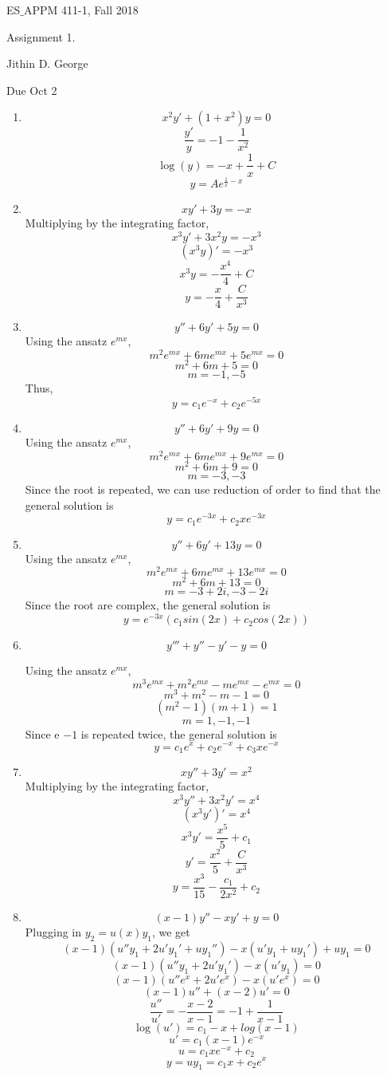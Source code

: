 \documentclass[letterpaper,12pt]{article}
\begin{document}




\noindent
{\scriptsize ES$\_$APPM 411-1, Fall 2018} \hfill

\begin{center}
\large
Assignment 1.
\normalsize

Jithin D. George
\end{center}

\noindent
Due Oct 2
\vspace{.3in}




\noindent


\begin{enumerate}
\item
\[x^2y' +(1+x^2)y =0\]
\[\frac{y'}{y} = -1- \frac{1}{x^2}\]
\[\log(y)= -x+\frac{1}{x}+C\]
\[y = Ae^{\frac{1}{x}-x}\]
\item
\[xy' + 3y=-x\]
Multiplying by the integrating factor,
\[x^3y' + 3x^2y=-x^3\]
\[(x^3y)'=-x^3\]
\[x^3y=-\frac{x^4}{4}+C\]
\[y=-\frac{x}{4}+\frac{C}{x^3}\]
\item
\[y'' +6y' +5y=0\]
Using the ansatz $e^{mx}$,
\[m^2e^{mx} + 6me^{mx}+5e^{mx}=0 \]
\[m^2 + 6m+5=0 \]
\[m = -1,-5\]
Thus,
\[y = c_1 e^{-x}+c_2 e^{-5x}\]
\item
\[y'' +6y' +9y=0\]
Using the ansatz $e^{mx}$,
\[m^2e^{mx} + 6me^{mx}+9e^{mx}=0 \]
\[m^2 + 6m+9=0 \]
\[m = -3,-3\]
Since the root is repeated, we can use reduction of order to find that the general solution is
\[y = c_1 e^{-3x}+c_2 xe^{-3x}\]
\item
\[y'' +6y' +13y=0\]
Using the ansatz $e^{mx}$,
\[m^2e^{mx} + 6me^{mx}+13e^{mx}=0 \]
\[m^2 + 6m+13=0 \]
\[m = -3+2i,-3-2i\]
Since the root are complex, the general solution is
\[y = e^{-3x}(c_1 sin(2x)+ c_2 cos(2x))\]

\item
\[y'''+y''-y'-y=0\]

Using the ansatz $e^{mx}$,
\[m^3e^{mx}+m^2e^{mx} -me^{mx}-e^{mx}=0 \]
\[m^3+m^2 -m-1=0 \]
\[(m^2-1)(m+1)=1\]
\[m = 1,-1,-1\]
Since e $-1$ is repeated twice, the general solution is
\[y = c_1 e^{x}+ c_2 e^{-x}+c_3 xe^{-x}\]

\item
\[xy'' + 3y'=x^2\]
Multiplying by the integrating factor,
\[x^3y'' + 3x^2y'=x^4\]
\[(x^3y')'=x^4\]
\[x^3y'=\frac{x^5}{5}+c_1\]
\[y'=\frac{x^2}{5}+\frac{C}{x^3}\]
\[y =\frac{x^3}{15}-\frac{c_1}{2x^2}+c_2\]
\item
\[(x-1)y''-xy'+y=0\]
Plugging in $y_2 = u(x)y_1$, we get
\[(x-1)(u''y_1 +2u'y_1'+uy_1'')-x(u'y_1+uy_1')+uy_1=0\]
\[(x-1)(u''y_1 +2u'y_1')-x(u'y_1)=0\]
\[(x-1)(u''e^{x} +2u'e^x)-x(u'e^x)=0\]
\[(x-1)u''+ (x-2)u'=0\]
\[\frac{u''}{u'}=-\frac{x-2}{x-1}= -1 + \frac{1}{x-1}\]
\[\log(u')= c_1-x +log(x-1)\]
\[u'= c_1(x-1)e^{-x}\]
\[u= c_1xe^{-x} +c_2\]
\[y = uy_1 = c_1 x + c_2 e^x\]
\end{enumerate}
\end{document}
